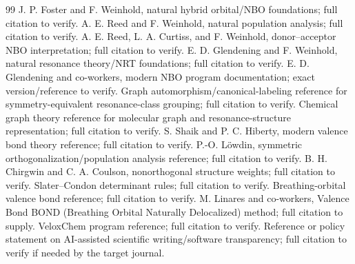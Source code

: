 \documentclass[11pt]{article}
\begin{document}
\begin{thebibliography}{99}
 J. P. Foster and F. Weinhold, natural hybrid orbital/NBO foundations; full citation to verify.
 A. E. Reed and F. Weinhold, natural population analysis; full citation to verify.
 A. E. Reed, L. A. Curtiss, and F. Weinhold, donor--acceptor NBO interpretation; full citation to verify.
 E. D. Glendening and F. Weinhold, natural resonance theory/NRT foundations; full citation to verify.
 E. D. Glendening and co-workers, modern NBO program documentation; exact version/reference to verify.
 Graph automorphism/canonical-labeling reference for symmetry-equivalent resonance-class grouping; full citation to verify.
 Chemical graph theory reference for molecular graph and resonance-structure representation; full citation to verify.
 S. Shaik and P. C. Hiberty, modern valence bond theory reference; full citation to verify.
 P.-O. L\"owdin, symmetric orthogonalization/population analysis reference; full citation to verify.
 B. H. Chirgwin and C. A. Coulson, nonorthogonal structure weights; full citation to verify.
 Slater--Condon determinant rules; full citation to verify.
 Breathing-orbital valence bond reference; full citation to verify.
 M. Linares and co-workers, Valence Bond BOND (Breathing Orbital Naturally Delocalized) method; full citation to supply.
 VeloxChem program reference; full citation to verify.
 Reference or policy statement on AI-assisted scientific writing/software transparency; full citation to verify if needed by the target journal.
\end{thebibliography}
\end{document}
